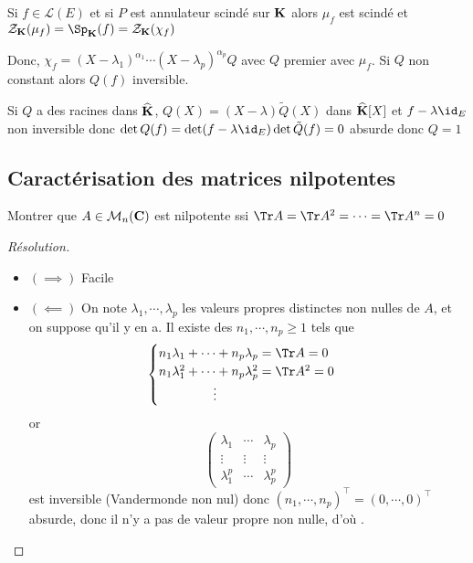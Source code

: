 \begin{rem}
    Si $f\in\mathcal L(E)$ et si $P$ est annulateur scindé sur $\mathbf K$ alors $\mu_f$ est scindé et $\mathcal Z_{\K}(\mu_f)=\Sp_{\K}(f)=\mathcal Z_{\K}(\chi_f)$

    Donc, $\chi_f=(X-\lambda_1)^{\alpha_1}\cdots (X-\lambda_p)^{\alpha_p}Q$ avec $Q$ premier avec $\mu_f$. Si $Q$ non constant alors $Q(f)$ inversible.

    Si $Q$ a des racines dans $\widehat{\mathbf K}$, $Q(X)=(X-\lambda)\tilde Q(X)$ dans $\widehat {\mathbf K}[X]$ et $f-\lambda\id_E$ non inversible donc $\det Q(f)=\det (f-\lambda\id_E)\det\tilde Q(f)=0$ absurde donc $Q=1$
\end{rem}

\subsection{Caractérisation des matrices nilpotentes}

\begin{exo}
    Montrer que $A\in\mathcal M_n(\mathbf C)$ est nilpotente ssi $\Tr A=\Tr A^2=\cdots =\Tr A^n=0$
\end{exo}

\begin{proof}[Résolution]~
    \begin{itemize}
        \item $(\implies)$ Facile
        \item $(\impliedby)$ On note $\lambda_1, \cdots, \lambda_p$ les valeurs propres distinctes non nulles de $A$, et on suppose qu'il y en a. Il existe des $n_1, \cdots, n_p\geq 1$ tels que \[
                \begin{cases}
                    n_1\lambda_1+\cdots+n_p\lambda_p=\Tr A=0\\
                    n_1\lambda_1^2+\cdots+n_p\lambda_p^2=\Tr A^2=0\\
                    \hspace{1.5cm}\vdots
                \end{cases}
            \]
            or \[
                \begin{pmatrix}
                    \lambda_1 & \cdots & \lambda_p \\
                    \vdots & \vdots & \vdots \\
                    \lambda_1^p & \cdots & \lambda_p^p
                \end{pmatrix}
            \]
            est inversible (Vandermonde non nul) donc $(n_1, \cdots, n_p)^\top=(0, \cdots, 0)^\top$ absurde, donc il n'y a pas de valeur propre non nulle, d'où \conc.
    \end{itemize}
\end{proof}

